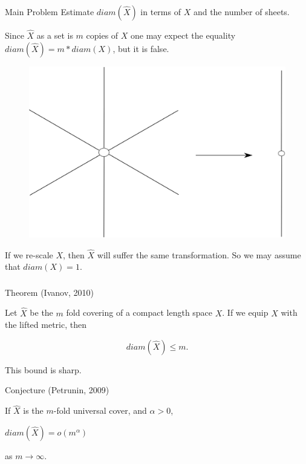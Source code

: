 \documentclass{beamer}
\begin{document}
\begin{frame}\frametitle{}


\begin{block}{Main Problem}
{Estimate $diam(\hat{X}) $ in terms of $X$ and the number of sheets.
}
\end{block}
\bigskip


Since $\hat{X}$ as a set is $m$ copies of $X$ one may expect the equality $diam(\hat{X}) = m * diam (X) $, but it is false.

\begin{figure}
\centering
\includegraphics[scale=0.30]{Star.eps}
\end{figure}


If we re-scale $X$, then $\hat{X}$ will suffer the same transformation. So we may assume that $diam(X) = 1$.


\end{frame}







\begin{frame}\frametitle{}

\begin{block}{Theorem (Ivanov, 2010)}
{Let $\hat{X}$ be the $m$ fold covering of a compact length space $X$. If we equip $\hat{X}$ with the lifted metric, then

$$diam (\hat{X})  \leq m. $$

This bound is sharp.
}
\end{block}

\bigskip
\pause
\begin{block}{Conjecture (Petrunin, 2009)}
{If $\hat{X}$ is the $m$-fold universal cover, and $\alpha >0$,

\begin{center}
  $diam(\hat{X}) =   o( m^{\alpha}) $
\end{center}
 as $m \rightarrow \infty$. 
 }
\end{block}


\end{frame}
\end{document}

